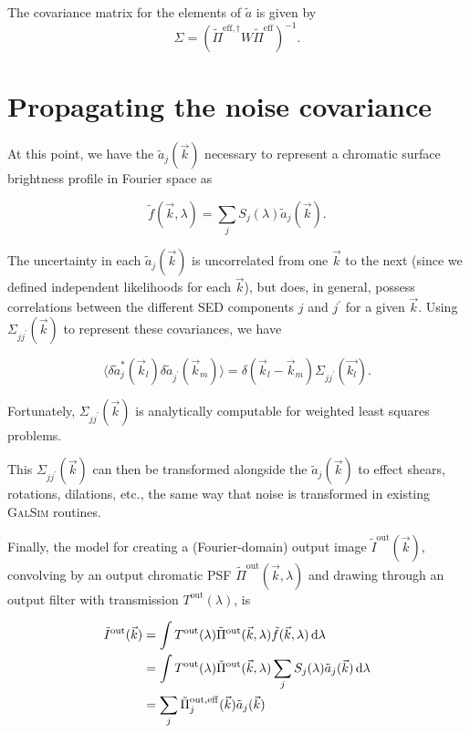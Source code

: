 \documentclass{article}
\begin{document}
The covariance matrix for the elements of $\tilde{a}$ is given by
\begin{equation}
    \Sigma = \left(\tilde{\Pi}^{\mathrm{eff}, \dagger} W \tilde{\Pi}^\mathrm{eff} \right)^{-1}.
\end{equation}

\section{Propagating the noise covariance}

At this point, we have the $\tilde{a}_j(\vec{k})$ necessary to represent a chromatic surface
brightness profile in Fourier space as

\begin{equation}
  \tilde{f}(\vec{k}, \lambda) = \sum_j S_j(\lambda) \tilde{a}_j(\vec{k}).
\end{equation}

The uncertainty in each $\tilde{a}_j(\vec{k})$ is uncorrelated from one $\vec{k}$ to the next (since
we defined independent likelihoods for each $\vec{k}$), but does, in general, possess correlations
between the different SED components $j$ and $j^\prime$ for a given $\vec{k}$.  Using
$\Sigma_{jj^\prime}(\vec{k})$ to represent these covariances, we have

\begin{equation}
    \langle\delta\tilde{a}^*_j(\vec{k}_l)\delta\tilde{a}_{j^\prime}(\vec{k}_m)\rangle = \delta(\vec{k}_l - \vec{k}_m)\Sigma_{jj^\prime}(\vec{k_l}).
\end{equation}

Fortunately, $\Sigma_{jj^\prime}(\vec{k})$ is analytically computable for weighted least squares
problems.

This $\Sigma_{jj^\prime}(\vec{k})$ can then be transformed alongside the $\tilde{a}_j(\vec{k})$ to
effect shears, rotations, dilations, etc., the same way that noise is transformed in existing
\textsc{GalSim} routines.

Finally, the model for creating a (Fourier-domain) output image $\tilde{I}^\mathrm{out}(\vec{k})$,
convolving by an output chromatic PSF $\tilde{\Pi}^\mathrm{out}(\vec{k}, \lambda)$ and drawing
through an output filter with transmission $T^\mathrm{out}(\lambda)$, is

\begin{align}
    \tilde{I}^\mathrm{out}(\vec{k})
    &= \int T^\mathrm{out}(\lambda) \tilde{\Pi}^\mathrm{out}(\vec{k}, \lambda) \tilde{f}(\vec{k}, \lambda) \dif{\lambda} \\
    &= \int T^\mathrm{out}(\lambda) \tilde{\Pi}^\mathrm{out}(\vec{k}, \lambda) \sum_j S_j(\lambda) \tilde{a}_j(\vec{k}) \dif{\lambda} \\
    &= \sum_j \tilde{\Pi}_j^\mathrm{out, eff}(\vec{k}) \tilde{a}_j(\vec{k})
\end{align}
\end{document}
